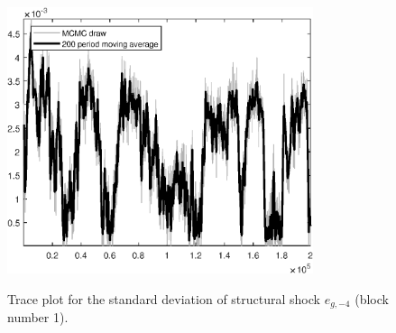 \begin{figure}[H]
\centering
  \includegraphics[width=0.8\textwidth]{BRS_sectoral_rest/graphs/TracePlot_SE_e_g_news_blck_1}\\
    \caption{Trace plot for the standard deviation of structural shock ${e_{g,-4}}$ (block number 1).}
\end{figure}
